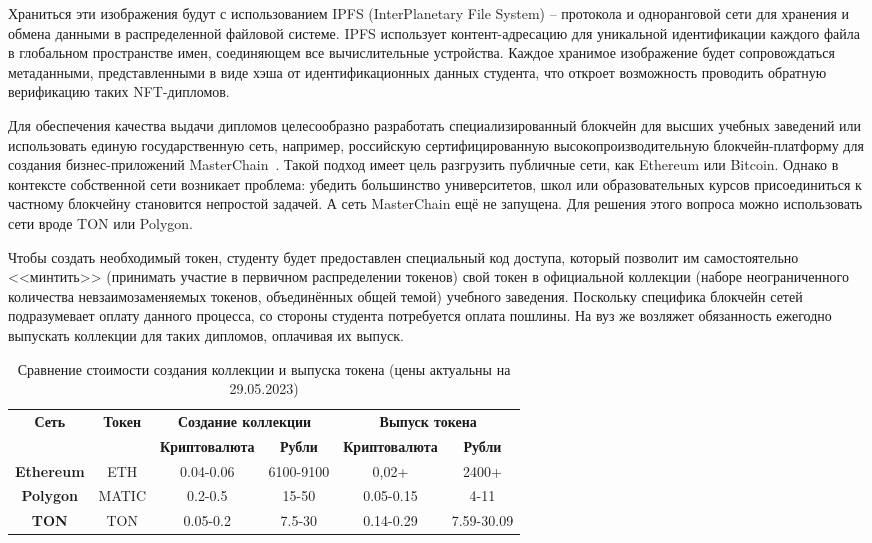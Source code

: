 \documentclass{mirea-article}
\begin{document}
Храниться эти изображения будут с использованием IPFS (InterPlanetary File System) – протокола и одноранговой сети для хранения и обмена данными в распределенной файловой системе. IPFS использует контент-адресацию для уникальной идентификации каждого файла в глобальном пространстве имен, соединяющем все вычислительные устройства. Каждое хранимое изображение будет сопровождаться метаданными, представленными в виде хэша от идентификационных данных студента, что откроет возможность проводить обратную верификацию таких NFT-дипломов.

Для обеспечения качества выдачи дипломов целесообразно разработать специализированный блокчейн для высших учебных заведений или использовать единую государственную сеть, например, российскую сертифицированную высокопроизводительную блокчейн-платформу для создания бизнес-приложений MasterChain~\cite{bib:masterchain}. Такой подход имеет цель разгрузить публичные сети, как Ethereum или Bitcoin. Однако в контексте собственной сети возникает проблема: убедить большинство университетов, школ или образовательных курсов присоединиться к частному блокчейну становится непростой задачей. А сеть MasterChain ещё не запущена. Для решения этого вопроса можно использовать сети вроде TON или Polygon.

Чтобы создать необходимый токен, студенту будет предоставлен специальный код доступа, который позволит им самостоятельно <<минтить>> (принимать участие в первичном распределении токенов) свой токен в официальной коллекции (наборе неограниченного количества невзаимозаменяемых токенов, объединённых общей темой) учебного заведения. Поскольку специфика блокчейн сетей подразумевает оплату данного процесса, со стороны студента потребуется оплата пошлины. На вуз же возляжет обязанность ежегодно выпускать коллекции для таких дипломов, оплачивая их выпуск.

\begin{table}[htb]
    \caption{Сравнение стоимости создания коллекции и выпуска токена (цены актуальны на 29.05.2023)}
    \centering
    \setlength{\tabcolsep}{10pt} %
    \renewcommand{\arraystretch}{1.5} %

    \begin{tabular}{|c|c|c|c|c|c|}
        \hline
        \multirow{2}{*}{\textbf{Сеть}} & \multirow{2}{*}{\textbf{Токен}} & \multicolumn{2}{c|}{\textbf{Создание коллекции}} & \multicolumn{2}{c|}{\textbf{Выпуск токена}} \\ \cline{3-6} 
         &  & \small{\textbf{Криптовалюта}} & \small{\textbf{Рубли}} & \small{\textbf{Криптовалюта}} & \small{\textbf{Рубли}} \\ \hline
        \textbf{Ethereum} & ETH & 0.04-0.06 & 6100-9100 & 0,02+ & 2400+ \\ \hline
        \textbf{Polygon} & MATIC & 0.2-0.5 & 15-50 & 0.05-0.15 & 4-11 \\ \hline
        \textbf{TON} & TON & 0.05-0.2 & 7.5-30 & 0.14-0.29 & 7.59-30.09 \\ \hline
    \end{tabular}
\end{table}
\end{document}
